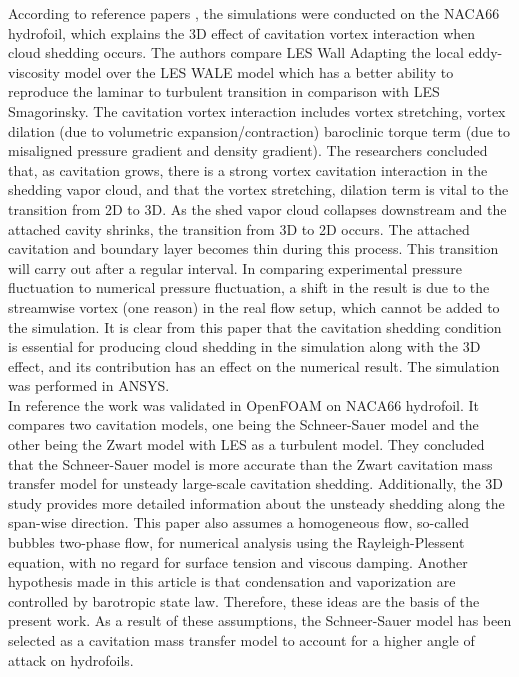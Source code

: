 According to reference papers \cite{JI2015, JI2017}, the simulations 
were conducted on the NACA66 hydrofoil, which explains the 3D effect 
of cavitation vortex interaction when cloud shedding occurs. The authors compare LES Wall
Adapting the local eddy-viscosity model over the LES WALE model which has
a better ability to reproduce the laminar to turbulent transition in
comparison with LES Smagorinsky. The cavitation vortex interaction
includes vortex stretching, vortex dilation (due to volumetric
expansion/contraction) baroclinic torque term (due to misaligned
pressure gradient and density gradient). The researchers concluded that, 
as cavitation grows, there is a strong vortex cavitation interaction in 
the shedding vapor cloud, and that the vortex stretching, dilation term 
is vital to the transition from 2D to 3D. As the shed vapor cloud collapses 
downstream and the attached cavity shrinks, the transition from 3D to 2D occurs. 
The attached cavitation and boundary layer becomes thin during this process. 
This transition will carry out after a regular interval. In comparing experimental pressure 
fluctuation to numerical pressure fluctuation, a shift in the result is 
due to the streamwise vortex (one reason) in the real flow setup, which 
cannot be added to the simulation. It is clear from this paper that the 
cavitation shedding condition is essential for producing cloud shedding 
in the simulation along with the 3D effect, and its contribution has an 
effect on the numerical result. The simulation was performed in ANSYS.\\
 


In reference \cite{Hidalgo2014,Hai2020,Hidalgo2014-2} the work
was validated in OpenFOAM on NACA66 hydrofoil. It compares two cavitation models, 
one being the Schneer-Sauer model and the other being the Zwart model with 
LES as a turbulent model. They concluded that the Schneer-Sauer model 
is more accurate than the Zwart cavitation mass transfer model for 
unsteady large-scale cavitation shedding. Additionally, the 3D study 
provides more detailed information about the unsteady shedding along the span-wise 
direction. This paper also assumes a homogeneous flow, so-called bubbles two-phase flow, 
for numerical analysis using the Rayleigh-Plessent equation, with no regard for 
surface tension and viscous damping. Another hypothesis made in this article is 
that condensation and vaporization are controlled by barotropic state law. Therefore, these ideas are the basis of the present work. 
As a result of these assumptions, the Schneer-Sauer model has been 
selected as a cavitation mass transfer model to account for a higher angle of attack on hydrofoils.\\

